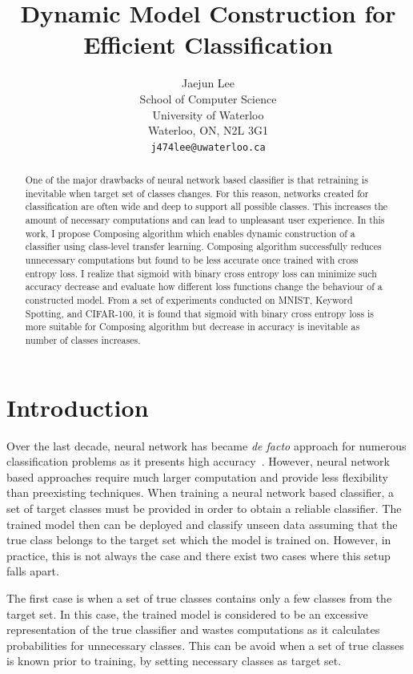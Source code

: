 \documentclass{article}
\title{Dynamic Model Construction for Efficient Classification}
\author{
    Jaejun Lee \\
    School of Computer Science\\
    University of Waterloo\\
    Waterloo, ON, N2L 3G1 \\
    \texttt{j474lee@uwaterloo.ca} \\
}
\begin{document}
\maketitle

\begin{abstract}

One of the major drawbacks of neural network based classifier is that retraining is inevitable when target set of classes changes. For this reason, networks created for classification are often wide and deep to support all possible classes. This increases the amount of necessary computations and can lead to unpleasant user experience. In this work, I propose Composing algorithm which enables dynamic construction of a classifier using class-level transfer learning. Composing algorithm successfully reduces unnecessary computations but found to be less accurate once trained with cross entropy loss. I realize that sigmoid with binary cross entropy loss can minimize such accuracy decrease and evaluate how different loss functions change the behaviour of a constructed model. From a set of experiments conducted on MNIST, Keyword Spotting, and CIFAR-100, it is found that sigmoid with binary cross entropy loss is more suitable for Composing algorithm but decrease in accuracy is inevitable as number of classes increases.

\end{abstract}

\section{Introduction}

Over the last decade, neural network has became {\it de facto} approach for numerous classification problems as it presents high accuracy~\cite{lecun1998gradient, chen2014small, krizhevsky2009learning}. However, neural network based approaches require much larger computation and provide less flexibility than preexisting techniques. When training a neural network based classifier, a set of target classes must be provided in order to obtain a reliable classifier. The trained model then can be deployed and classify unseen data assuming that the true class belongs to the target set which the model is trained on. However, in practice, this is not always the case and there exist two cases where this setup falls apart.

The first case is when a set of true classes contains only a few classes from the target set. In this case, the trained model is considered to be an excessive representation of the true classifier and wastes computations as it calculates probabilities for unnecessary classes. This can be avoid when a set of true classes is known prior to training, by setting necessary classes as target set.
\end{document}
